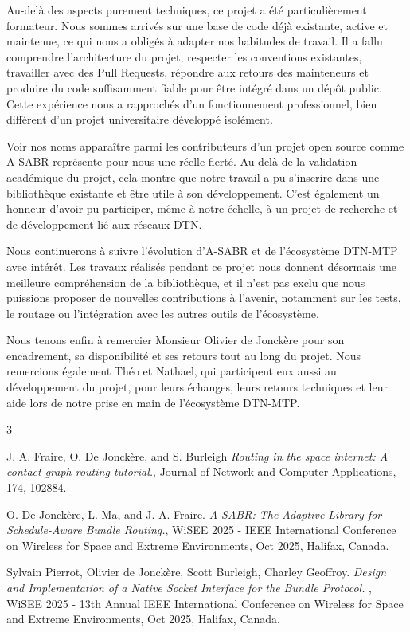 \documentclass{article}
\begin{document}
Au-delà des aspects purement techniques, ce projet a été particulièrement formateur. Nous sommes arrivés sur une base de code déjà existante, active et maintenue, ce qui nous a obligés à adapter nos habitudes de travail. Il a fallu comprendre l’architecture du projet, respecter les conventions existantes, travailler avec des Pull Requests, répondre aux retours des mainteneurs et produire du code suffisamment fiable pour être intégré dans un dépôt public. Cette expérience nous a rapprochés d’un fonctionnement professionnel, bien différent d’un projet universitaire développé isolément.

Voir nos noms apparaître parmi les contributeurs d’un projet open source comme A-SABR représente pour nous une réelle fierté. Au-delà de la validation académique du projet, cela montre que notre travail a pu s’inscrire dans une bibliothèque existante et être utile à son développement. C’est également un honneur d’avoir pu participer, même à notre échelle, à un projet de recherche et de développement lié aux réseaux DTN.

Nous continuerons à suivre l’évolution d’A-SABR et de l’écosystème DTN-MTP avec intérêt. Les travaux réalisés pendant ce projet nous donnent désormais une meilleure compréhension de la bibliothèque, et il n’est pas exclu que nous puissions proposer de nouvelles contributions à l’avenir, notamment sur les tests, le routage ou l’intégration avec les autres outils de l’écosystème.

Nous tenons enfin à remercier Monsieur Olivier de Jonckère pour son encadrement, sa disponibilité et ses retours tout au long du projet. Nous remercions également Théo et Nathael, qui participent eux aussi au développement du projet, pour leurs échanges, leurs retours techniques et leur aide lors de notre prise en main de l’écosystème DTN-MTP.
\vfill
\begin{thebibliography}{3} 

J. A. Fraire, O. De Jonckère, and S. Burleigh \textit{Routing in the space internet: A
contact graph routing tutorial.}, Journal of Network and Computer Applications, 174, 102884.

O. De Jonckère, L. Ma, and J. A. Fraire. \textit{ A-SABR: The Adaptive Library for Schedule-Aware Bundle
Routing.}, WiSEE 2025 - IEEE International Conference on Wireless for Space and Extreme Environments, Oct 2025,
Halifax, Canada.

Sylvain Pierrot, Olivier de Jonckère, Scott Burleigh, Charley Geoffroy.\textit{ Design and Implementation of a Native Socket Interface for the Bundle Protocol.}
, WiSEE 2025 - 13th Annual IEEE International Conference on Wireless for Space and Extreme Environments, Oct 2025, Halifax, Canada.

\end{thebibliography}
\newpage
\end{document}
